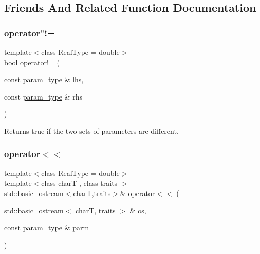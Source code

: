 \subsection{Friends And Related Function Documentation}
\mbox{\label{classpareto__distribution_1_1param__type_aa559d0d98e88e84417364a89b83cf5b2}} 
\subsubsection{\texorpdfstring{operator"!=}{operator!=}}
{\footnotesize\ttfamily template$<$class Real\+Type  = double$>$ \\
bool operator!= (\begin{DoxyParamCaption}\item[{const \mbox{\hyperlink{classpareto__distribution_1_1param__type}{param\+\_\+type}} \&}]{lhs,  }\item[{const \mbox{\hyperlink{classpareto__distribution_1_1param__type}{param\+\_\+type}} \&}]{rhs }\end{DoxyParamCaption})\hspace{0.3cm}{\ttfamily [friend]}}



Returns true if the two sets of parameters are different. 

\mbox{\label{classpareto__distribution_1_1param__type_a2dfa898eef3da7b00ae3d8aaa1b8f87c}} 
\subsubsection{\texorpdfstring{operator$<$$<$}{operator<<}}
{\footnotesize\ttfamily template$<$class Real\+Type  = double$>$ \\
template$<$class charT , class traits $>$ \\
std\+::basic\+\_\+ostream$<$charT,traits$>$\& operator$<$$<$ (\begin{DoxyParamCaption}\item[{std\+::basic\+\_\+ostream$<$ charT, traits $>$ \&}]{os,  }\item[{const \mbox{\hyperlink{classpareto__distribution_1_1param__type}{param\+\_\+type}} \&}]{parm }\end{DoxyParamCaption})\hspace{0.3cm}{\ttfamily [friend]}}



